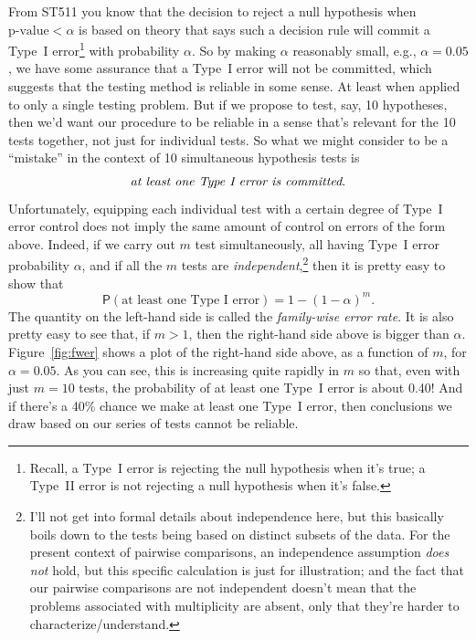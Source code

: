 \documentclass[a4paper, 12pt]{article}
\theoremstyle{plain}
\theoremstyle{definition}
\theoremstyle{remark}
\newcommand{\prob}{\mathsf{P}}
\begin{document}
From ST511 you know that the decision to reject a null hypothesis when $\text{p-value} < \alpha$ is based on theory that says such a decision rule will commit a Type~I error\footnote{Recall, a Type~I error is rejecting the null hypothesis when it's true; a Type~II error is not rejecting a null hypothesis when it's false.} with probability $\alpha$.  So by making $\alpha$ reasonably small, e.g., $\alpha=0.05$, we have some assurance that a Type~I error will not be committed, which suggests that the testing method is reliable in some sense.  At least when applied to only a single testing problem.  But if we propose to test, say, 10 hypotheses, then we'd want our procedure to be reliable in a sense that's relevant for the 10 tests together, not just for individual tests.  So what we might consider to be a ``mistake'' in the context of 10 simultaneous hypothesis tests is 
\[ \text{\em at least one Type I error is committed}. \]
Unfortunately, equipping each individual test with a certain degree of Type~I error control does not imply the same amount of control on errors of the form above.  Indeed, if we carry out $m$ test simultaneously, all having Type~I error probability $\alpha$, and if all the $m$ tests are {\em independent},\footnote{I'll not get into formal details about independence here, but this basically boils down to the tests being based on distinct subsets of the data.  For the present context of pairwise comparisons, an independence assumption {\em does not} hold, but this specific calculation is just for illustration; and the fact that our pairwise comparisons are not independent doesn't mean that the problems associated with multiplicity are absent, only that they're harder to characterize/understand.} then it is pretty easy to show that 
\[ \prob(\text{at least one Type~I error}) = 1 - (1-\alpha)^m. \]
The quantity on the left-hand side is called the {\em family-wise error rate}.  It is also pretty easy to see that, if $m > 1$, then the right-hand side above is bigger than $\alpha$.  Figure~\ref{fig:fwer} shows a plot of the right-hand side above, as a function of $m$, for $\alpha=0.05$.  As you can see, this is increasing quite rapidly in $m$ so that, even with just $m=10$ tests, the probability of at least one Type~I error is about 0.40!  And if there's a 40\% chance we make at least one Type~I error, then conclusions we draw based on our series of tests cannot be reliable.  
\end{document}
